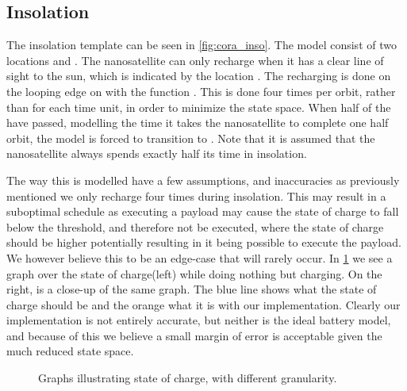 \subsection*{Insolation} \label{ssec:cora_ins}
The insolation template can be seen in \cref{fig:cora_inso}. The model consist of two locations  and . The nanosatellite can only recharge when it has a clear line of sight to the sun, which is indicated by the location . The recharging is done on the looping edge on  with the function . This is done four times per orbit, rather than for each time unit, in order to minimize the state space. When half of the  have passed, modelling the time it takes the nanosatellite to complete one half orbit, the model is forced to transition to . Note that it is assumed that the nanosatellite always spends exactly half its time in insolation.

The way this is modelled have a few assumptions, and inaccuracies as previously mentioned we only recharge four times during insolation. This may result in a suboptimal schedule as executing a payload may cause the state of charge to fall below the threshold, and therefore not be executed, where the state of charge should be higher potentially resulting in it being possible to execute the payload. We however believe this to be an edge-case that will rarely occur.
In \cref{fig:granularity} we see a graph over the state of charge(left) while doing nothing but charging. On the right, is a close-up of the same graph. The blue line shows what the state of charge should be and the orange what it is with our implementation. Clearly our implementation is not entirely accurate, but neither is the ideal battery model, and because of this we believe a small margin of error is acceptable given the much reduced state space.

\begin{figure}[H]%
	\centering
	\qquad
	\caption{Graphs illustrating state of charge, with different granularity.}%
	\label{fig:granularity}%
\end{figure}

